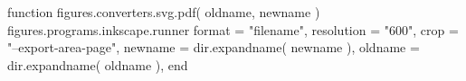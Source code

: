 %
%

\setupexternalfigures[
  directory={\env{themesdir},\env{imagesdir},\env{cachesdir}},
  cache={\env{cachesdir}},
  location={global,local.default},
]

\startluacode
function figures.converters.svg.pdf( oldname, newname )
  figures.programs.inkscape.runner {
    format     = "filename",
    resolution = "600",
    crop       = "--export-area-page",
    newname    = dir.expandname( newname ),
    oldname    = dir.expandname( oldname ),
  }
end
\stopluacode

